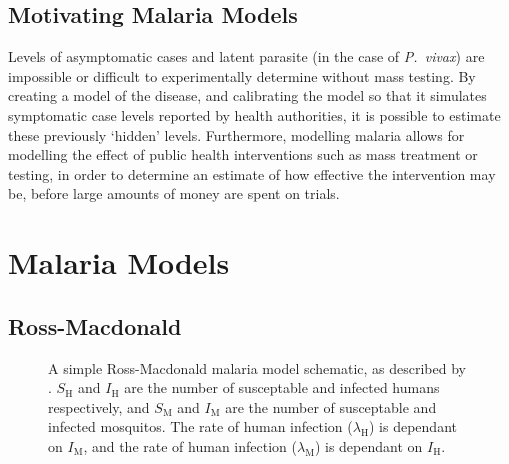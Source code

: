\subsection*{Motivating Malaria Models}

Levels of asymptomatic cases and latent parasite (in the case of
\textit{P.\ vivax}) are impossible or difficult to experimentally determine
without mass testing. By creating a model of the disease, and calibrating the
model so that it simulates symptomatic case levels reported by health
authorities, it is possible to estimate these previously `hidden' levels.
Furthermore, modelling malaria allows for modelling the effect of public health
interventions such as mass treatment or testing, in order to determine an
estimate of how effective the intervention may be, before large amounts of
money are spent on trials.

\section{Malaria Models}

\subsection*{Ross-Macdonald}

\begin{figure}[htbp]
    \centering
    \caption{A simple Ross-Macdonald malaria model schematic, as described by \cite{aron_population_1982}. $S_\mathrm{H}$ and $I_\mathrm{H}$ are the number of susceptable and infected humans respectively, and $S_\mathrm{M}$ and $I_\mathrm{M}$ are the number of susceptable and infected mosquitos. The rate of human infection ($\lambda_\mathrm{H}$) is dependant on $I_\mathrm{M}$, and the rate of human infection ($\lambda_\mathrm{M}$) is dependant on $I_\mathrm{H}$.}\label{fig:ross_mac}
\end{figure}

